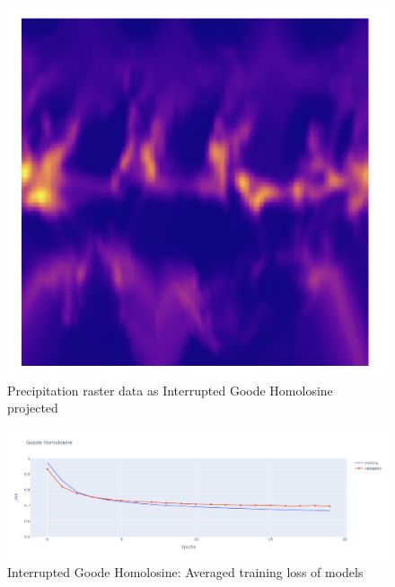 \begin{figure}[H]
    \begin{minipage}{0.30\textwidth}
        \centering
        \includegraphics[width=0.9\linewidth]{figures/chapter-8/prect_goode.png}
        \caption{Precipitation raster data as Interrupted Goode Homolosine projected}
        \label{fig:ig_prect_raster}
    \end{minipage}\hfill
\end{figure}

\begin{figure}[H]
    \centering
    \includegraphics[width=1.0\linewidth]{figures/chapter-8/goode_loss.png}
    \caption{Interrupted Goode Homolosine: Averaged training loss of models  }
    \label{fig:goode_loss}
\end{figure}
